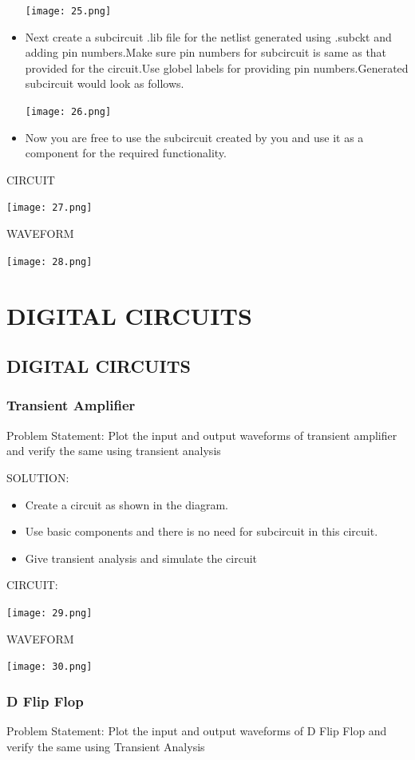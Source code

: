 \documentclass[12pt,a4paper]{  report}
\begin{document}
\begin{itemize}
 \begin{flushleft}
\texttt{[image: 25.png]}
\end{flushleft}
\item Next create a subcircuit  .lib file for the netlist generated using .subckt and adding pin numbers.Make sure pin numbers for subcircuit is same as that provided for the circuit.Use globel labels for providing pin numbers.Generated subcircuit would look as follows.
 \begin{flushleft}
\texttt{[image: 26.png]}
\end{flushleft}
\item Now you are free to use the subcircuit created by you and use it as a component for the required functionality.
\end{itemize}
CIRCUIT
 \begin{flushleft}
\texttt{[image: 27.png]}
\end{flushleft}
WAVEFORM
\begin{flushleft}
\texttt{[image: 28.png]}
\end{flushleft}
\chapter{\textbf{DIGITAL CIRCUITS}}
\section{DIGITAL CIRCUITS}
\subsection{Transient Amplifier}
 Problem Statement:
Plot the input and output waveforms of transient amplifier and verify the same using transient analysis

SOLUTION:
\begin{itemize}
\item Create a circuit as shown in the diagram.
\item Use basic components and there is no need for subcircuit in this circuit.
\item Give transient analysis and simulate the circuit
\end{itemize}
CIRCUIT:
 \begin{flushleft}
\texttt{[image: 29.png]}
\end{flushleft}
WAVEFORM
 \begin{flushleft}
\texttt{[image: 30.png]}
\end{flushleft}
\subsection{D Flip Flop}
Problem Statement:
Plot the input and output waveforms of D Flip Flop and verify the same using Transient Analysis
\end{document}
